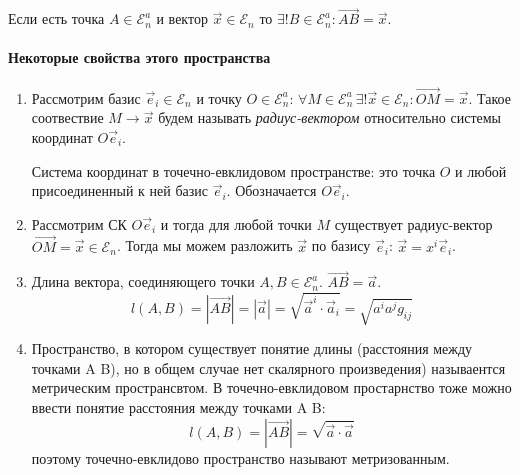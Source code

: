 Если есть точка $A \in \mathcal{E}_n^a$ и вектор $\vec{x} \in \mathcal{E}_n$ то $\exists! B \in \mathcal{E}_n^a : \vec{AB} = \vec{x}$.

\paragraph{Некоторые свойства этого пространства}
\begin{enumerate}
  \item Рассмотрим базис $\vec{e}_i \in \mathcal{E}_n$ и точку $O \in \mathcal{E}_n^a$:
    $\forall M \in \mathcal{E}_n^a \, \exists! \vec{x} \in \mathcal{E}_n : \vec{OM} = \vec{x}$.
    Такое соотвествие $M \to \vec{x}$ будем называть \emph{радиус-вектором} относительно системы координат $O\vec{e}_i$.
    \begin{definition}
      Система координат в точечно-евклидовом пространстве: это точка $O$ и любой присоединенный к ней
      базис $\vec{e}_i$. Обозначается $O\vec{e}_i$.
    \end{definition}
   
  \item Рассмотрим СК $O\vec{e}_i$ и тогда для любой точки $M$ существует радиус-вектор $\vec{OM} = \vec{x} \in \mathcal{E}_n$.
    Тогда мы можем разложить $\vec{x}$ по базису $\vec{e}_i$: $\vec{x} = x^i \vec{e}_i$.
    
    \begin{figure}[H]
    	\centering
    	
    \end{figure}

  \item Длина вектора, соединяющего точки $A, B \in \mathcal{E}_n^a$. $\vec{AB} = \vec{a}$.
    \[
      l(A, B) = |\vec{AB}| = |\vec{a}| = \sqrt{\vec{a}^i \cdot \vec{a}_i} = \sqrt{a^i a^j g_{ij}}
    \]
    
  	\begin{figure}[H]
  		\centering
  		
  	\end{figure}

  \item Пространство, в котором существует понятие длины (расстояния между точками A B), но в
    общем случае нет скалярного произведения) называентся метрическим пространсвтом.
    В точечно-евклидовом простарнство тоже можно ввести понятие расстояния между точками A B:
    \[
      l(A, B) = |\vec{AB}| = \sqrt{\vec{a} \cdot \vec{a}}
    \]
    поэтому точечно-евклидово пространство называют метризованным.


\end{enumerate}
